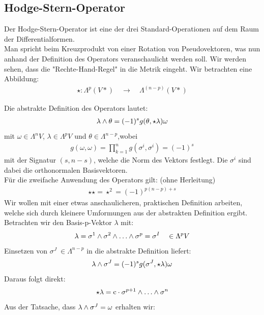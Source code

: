 \subsection{Hodge-Stern-Operator}
Der Hodge-Stern-Operator ist eine der drei Standard-Operationen auf dem Raum der Differentialformen. \\
Man spricht beim Kreuzprodukt von einer Rotation von Pseudovektoren, was nun anhand der Definition des Operators veranschaulicht werden soll. Wir werden sehen, dass die "Rechte-Hand-Regel" in die Metrik eingeht.
Wir betrachten eine Abbildung:
\begin{align*}
\star : \Lambda^p(V*) \quad \rightarrow \quad  \Lambda^{(n-p)}(V*) 
\end{align*}

Die abstrakte Definition des Operators lautet:
\begin{align}
\lambda \wedge \theta = (-1)^s g(\theta,\star\lambda)\omega
\end{align}
mit $\omega \in \Lambda^n V$, $\lambda \in \Lambda^p V$ und $\theta \in \Lambda^{n-p}$,wobei
 \begin{align}
 g(\omega,\omega) = \prod_{k=1}^{n} g(\sigma^{i},\sigma^{i}) = (-1)^s
 \end{align}
 mit der Signatur $(s,n-s)$, welche die Norm des Vektors festlegt. Die $\sigma^{i}$ sind dabei die orthonormalen Basisvektoren. \\
 Für die zweifache Anwendung des Operators gilt: (ohne Herleitung)
 \begin{align}
 \star \star = \star^2 = (-1)^{p(n-p)+s}
 \end{align}
 Wir wollen mit einer etwas anschaulicheren, praktischen Definition arbeiten, welche sich durch kleinere Umformungen aus der abstrakten Definition ergibt. \\
 Betrachten wir den Basis-p-Vektor $ \lambda$ mit:
 \begin{align}
 \lambda = \sigma^1 \w \sigma^2 \w \dots \w \sigma^p = \sigma^{I} \quad \in \Lambda^p V
 \end{align}
 Einsetzen von $\sigma^J \ \in \Lambda^{n-p}$ in die abstrakte Definition liefert:
\begin{align}
\lambda \wedge \sigma^J = (-1)^s g(\sigma^J,\star \lambda)\omega
\end{align}
Daraus folgt direkt:
\begin{align}
\star\lambda = \text{c} \cdot \sigma^{p+1} \w \dots \w \sigma^n
\end{align}
Aus der Tatsache, dass $\lambda\wedge\sigma^J = \omega$ erhalten wir:
